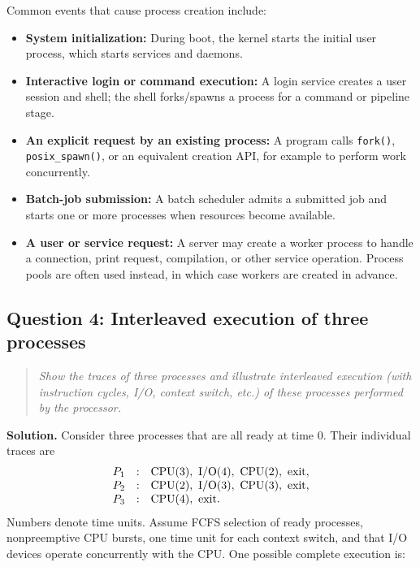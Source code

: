 Common events that cause process creation include:
\begin{itemize}
  \item \textbf{System initialization:} During boot, the kernel starts the
  initial user process, which starts services and daemons.
  \item \textbf{Interactive login or command execution:} A login service
  creates a user session and shell; the shell forks/spawns a process for a
  command or pipeline stage.
  \item \textbf{An explicit request by an existing process:} A program calls
  \texttt{fork()}, \texttt{posix\_spawn()}, or an equivalent creation API,
  for example to perform work concurrently.
  \item \textbf{Batch-job submission:} A batch scheduler admits a submitted
  job and starts one or more processes when resources become available.
  \item \textbf{A user or service request:} A server may create a worker
  process to handle a connection, print request, compilation, or other
  service operation.  Process pools are often used instead, in which case
  workers are created in advance.
\end{itemize}

\subsection{Question 4: Interleaved execution of three processes}
\begin{quote}
\itshape
Show the traces of three processes and illustrate interleaved execution
(with instruction cycles, I/O, context switch, etc.) of these processes
performed by the processor.
\end{quote}

\textbf{Solution.}
Consider three processes that are all ready at time \(0\).  Their individual
traces are
\[
\begin{array}{c@{\quad:\quad}l}
P_1 & \mathrm{CPU}(3),\ \mathrm{I/O}(4),\ \mathrm{CPU}(2),\ \mathrm{exit},\\
P_2 & \mathrm{CPU}(2),\ \mathrm{I/O}(3),\ \mathrm{CPU}(3),\ \mathrm{exit},\\
P_3 & \mathrm{CPU}(4),\ \mathrm{exit}.
\end{array}
\]
Numbers denote time units.  Assume FCFS selection of ready processes,
nonpreemptive CPU bursts, one time unit for each context switch, and that I/O
devices operate concurrently with the CPU.  One possible complete execution
is:

